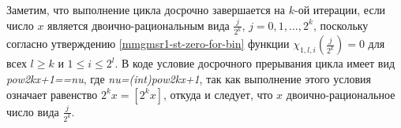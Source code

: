 Заметим, что выполнение цикла досрочно завершается на $k$-ой итерации, если число $x$ является двоично-рациональным вида $\frac{j}{2^k}$, $j = 0, 1,\ldots,2^k$, поскольку согласно утверждению \ref{mmgmsr1-st-zero-for-bin} функции $\chi_{1, l, i}(\frac{j}{2^k}) = 0$ для всех $l \geq k$ и $1 \leq i \leq 2^l$. В коде условие досрочного прерывания цикла имеет вид \textit{pow2kx+1==nu}, где \textit{nu=(int)pow2kx+1}, так как выполнение этого условия означает равенство $2^kx=[2^kx]$, откуда и следует, что $x$ двоично-рациональное число вида $\frac{j}{2^k}$.

%	
%	
%	
%	
%	
%	
%	


